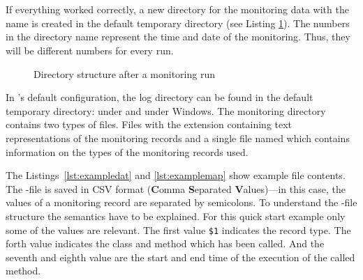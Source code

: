 \setBashListing 		
	



\quad\


\quad\

\noindent If everything worked correctly, a new directory for the monitoring data with the name  is created in the default temporary directory (see Listing \ref{fig:logtree}). The numbers in the directory name represent the time and date of the monitoring. Thus, they will be different numbers for every run.

\begin{figure}[H]
\begin{graybox}
\end{graybox}
\caption{Directory structure after a monitoring run}
\label{fig:logtree}
\end{figure}

\noindent In \Kieker's default configuration, the log directory can be found in the default temporary directory:  under \UnixLikeSystems{} and  under Windows. The monitoring directory contains two types of files. Files with the extension  containing text representations of the monitoring records and a single file named  which contains information on the types of the monitoring records used. 

The Listings~\ref{lst:exampledat} and \ref{lst:examplemap} show example file contents. The -file is saved in CSV format (\textbf{C}omma \textbf{S}eparated \textbf{V}alues)---in this case, the values of a monitoring record are separated by semicolons. To understand the -file structure the semantics have to be explained. For this quick start example only some of the values are relevant. The first value \verb!$1! indicates the record type. The forth value indicates the class and method which has been called. And the seventh and eighth value are the start and end time of the execution of the called method.

